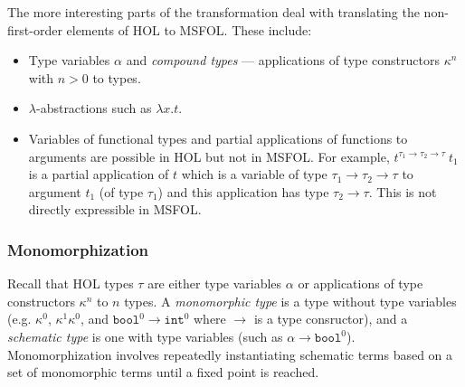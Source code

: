 \documentclass{article}
\begin{document}
	The more interesting parts of the 
	transformation deal with 
	translating the non-first-order
	elements of HOL to MSFOL. These 
	include:
	\begin{itemize}
		\item Type variables $\alpha$
		and \textit{compound types} ---
		applications of type constructors
		$\kappa^n$ with $n > 0$ to 
		types.
		\item $\lambda$-abstractions 
		such as $\lambda x. t$.
		\item Variables of functional 
		types and partial applications 
		of functions to arguments are 
		possible in HOL but not in 
		MSFOL. For example, 
		$t^{\tau_1 \to \tau_2 \to 
		\tau}\ t_1$ is a 
		partial application of $t$ 
		which is a variable of type 
		$\tau_1 \to \tau_2 \to \tau$
		to argument $t_1$ (of type 
		$\tau_1$) and this 
		application has type 
		$\tau_2 \to \tau$.
		This is not directly 
		expressible in MSFOL.
	\end{itemize}

	\subsubsection{Monomorphization}
		Recall that HOL types $\tau$ are 
		either type	variables $\alpha$ or 
		applications of type constructors 
		$\kappa^n$ to $n$ types.
		A \textit{monomorphic type} is a
		type without type variables 
		(e.g. $\kappa^0$, $\kappa^1 
		\kappa^0$, and $\texttt{bool}^0 
		\to \texttt{int}^0$ 
		where $\to$ is 
		a type consructor), and 
		a \textit{schematic type} is one 
		with type variables (such as 
		$\alpha \to \texttt{bool}^0$). 
		Monomorphization involves 
		repeatedly instantiating schematic
		terms based on a set of 
		monomorphic terms until a fixed 
		point is reached.
		
\end{document}
